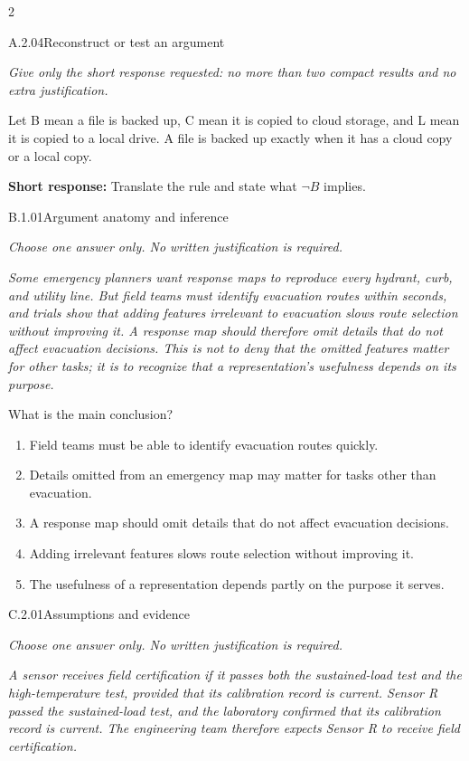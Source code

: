 \documentclass[9pt]{extarticle}
\newcommand{\choice}[1]{\item #1}
\begin{document}
\begin{multicols}{2}
\begin{DenseCoreProblem}{A.2.04}{Reconstruct or test an argument}
{\scriptsize\textit{Give only the short response requested: no more than two compact results and no extra justification.}\par}
Let B mean a file is backed up, C mean it is copied to cloud storage, and L mean it is copied to a local drive. A file is backed up exactly when it has a cloud copy or a local copy.

\textbf{Short response:} Translate the rule and state what $\neg B$ implies.
\end{DenseCoreProblem}
\begin{DenseCoreProblem}{B.1.01}{Argument anatomy and inference}
{\scriptsize\textit{Choose one answer only. No written justification is required.}\par}
\emph{Some emergency planners want response maps to reproduce every hydrant, curb, and utility line. But field teams must identify evacuation routes within seconds, and trials show that adding features irrelevant to evacuation slows route selection without improving it. A response map should therefore omit details that do not affect evacuation decisions. This is not to deny that the omitted features matter for other tasks; it is to recognize that a representation's usefulness depends on its purpose.}

What is the main conclusion?
\begin{enumerate}[label=(\alph*)]
  \choice{Field teams must be able to identify evacuation routes quickly.}
  \choice{Details omitted from an emergency map may matter for tasks other than evacuation.}
  \choice{A response map should omit details that do not affect evacuation decisions.}
  \choice{Adding irrelevant features slows route selection without improving it.}
  \choice{The usefulness of a representation depends partly on the purpose it serves.}
\end{enumerate}
\end{DenseCoreProblem}
\columnbreak
\begin{DenseCoreProblem}{C.2.01}{Assumptions and evidence}
{\scriptsize\textit{Choose one answer only. No written justification is required.}\par}
\emph{A sensor receives field certification if it passes both the sustained-load test and the high-temperature test, provided that its calibration record is current. Sensor R passed the sustained-load test, and the laboratory confirmed that its calibration record is current. The engineering team therefore expects Sensor R to receive field certification.}


\end{DenseCoreProblem}
\end{multicols}
\end{document}
